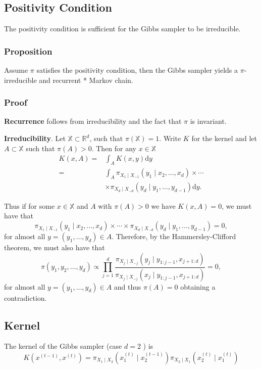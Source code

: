\documentclass{article}
\begin{document}
\subsection{Positivity Condition}
The positivity condition is sufficient for the Gibbs sampler to be irreducible.

\subsubsection{Proposition}
Assume $\pi$ satisfies the positivity condition, then the Gibbs sampler yields a $\pi$-irreducible and recurrent * Markov chain.

\subsubsection{Proof}
\textbf{Recurrence} follows from irreducibility and the fact that $\pi$ is invariant.

\textbf{Irreducibility}. Let $\mathbb{X} \subset \mathbb{R}^d$, such that $\pi(\mathbb{X})=1$. Write $K$ for the kernel and let $A \subset \mathbb{X}$ such that $\pi(A)>0$. Then for any $x \in \mathbb{X}$
$$
\begin{aligned}
K(x, A)= & \int_A K(x, y) \mathrm{d} y \\
= & \int_A \pi_{X_1 \mid X_{-1}}\left(y_1 \mid x_2, \ldots, x_d\right) \times \cdots \\
& \times \pi_{X_d \mid X_{-d}}\left(y_d \mid y_1, \ldots, y_{d-1}\right) \mathrm{d} y .
\end{aligned}
$$

Thus if for some $x \in \mathbb{X}$ and $A$ with $\pi(A)>0$ we have $K(x, A)=0$, we must have that
$$
\pi_{X_1 \mid X_{-1}}\left(y_1 \mid x_2, \ldots, x_d\right) \times \cdots \times \pi_{X_d \mid X_{-d}}\left(y_d \mid y_1, \ldots, y_{d-1}\right)=0,
$$
for almost all $y=\left(y_1, \ldots, y_d\right) \in A$.
Therefore, by the Hammersley-Clifford theorem, we must also have that
$$
\pi\left(y_1, y_2, \ldots, y_d\right) \propto \prod_{j=1}^d \frac{\pi_{X_j \mid X_{-j}}\left(y_j \mid y_{1: j-1}, x_{j+1: d}\right)}{\pi_{X_j \mid X_{-j}}\left(x_j \mid y_{1: j-1}, x_{j+1: d}\right)}=0,
$$
for almost all $y=\left(y_1, \ldots, y_d\right) \in A$ and thus $\pi(A)=0$ obtaining a contradiction.

\subsection{Kernel}
The kernel of the Gibbs sampler (case $d=2$ ) is
$$
K\left(x^{(t-1)}, x^{(t)}\right)=\pi_{X_1 \mid X_2}\left(x_1^{(t)} \mid x_2^{(t-1)}\right) \pi_{X_2 \mid X_1}\left(x_2^{(t)} \mid x_1^{(t)}\right)
$$
\end{document}
